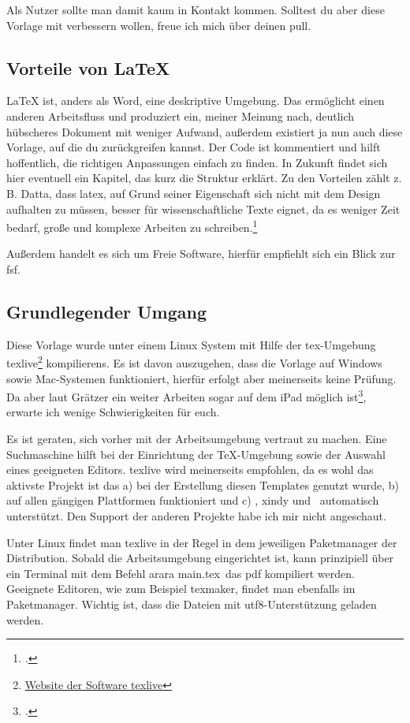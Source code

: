 Als Nutzer sollte man damit kaum in Kontakt kommen. Solltest du aber diese Vorlage mit verbessern wollen, freue ich mich über deinen \gls{pull}.
\subsection{Vorteile von \protect\LaTeX{}}%
\label{sec:vort-von}
\LaTeX{} ist, anders als Word, eine deskriptive Umgebung. Das ermöglicht einen anderen Arbeitsfluss und produziert ein, meiner Meinung nach, deutlich hübscheres Dokument mit weniger Aufwand, außerdem existiert ja nun auch diese Vorlage, auf die du zurückgreifen kannst. Der Code ist kommentiert und hilft hoffentlich, die richtigen Anpassungen einfach zu finden. In Zukunft findet sich hier eventuell ein Kapitel, das kurz die Struktur erklärt.
Zu den Vorteilen zählt z. B. Datta, dass \gls{latex}, auf Grund seiner Eigenschaft sich nicht mit dem Design aufhalten zu müssen, besser für wissenschaftliche Texte eignet, da es weniger Zeit bedarf, große und komplexe Arbeiten zu schreiben.\footcite[Vgl. ][S. 1f.]{datta_latex_2017}

Außerdem handelt es sich um Freie Software, hierfür empfiehlt sich ein Blick zur \gls{fsf}.
\subsection{Grundlegender Umgang}%
\label{sec:grundl}
Diese Vorlage wurde unter einem Linux System mit Hilfe der \gls{tex}-Umgebung texlive\footnote{\href{https://tug.org/texlive/}{Website der Software texlive}} \glspl{kompilieren}. Es ist davon auszugehen, dass die Vorlage auf Windows sowie Mac-Systemen funktioniert, hierfür erfolgt aber meinerseits keine Prüfung. Da aber laut Grätzer ein weiter Arbeiten sogar auf dem iPad möglich ist\footcite[Vgl. ][S. 179ff]{gratzer_practical_2014}, erwarte ich wenige Schwierigkeiten für euch.

Es ist geraten, sich vorher mit der Arbeitsumgebung vertraut zu machen. Eine Suchmaschine hilft bei der Einrichtung der TeX-Umgebung sowie der Auswahl eines geeigneten Editors. texlive wird meinerseits empfohlen, da es wohl das aktivste Projekt ist das a) bei der Erstellung diesen Templates genutzt wurde, b) auf allen gängigen Plattformen funktioniert und c) \protect{}, xindy und \protect{}\ automatisch unterstützt. Den Support der anderen Projekte habe ich mir nicht angeschaut.

Unter Linux findet man texlive in der Regel in dem jeweiligen Paketmanager der Distribution. Sobald die Arbeitsumgebung eingerichtet ist, kann prinzipiell über ein Terminal mit dem Befehl \glqq arara main.tex\grqq\ das pdf kompiliert werden.
Geeignete Editoren, wie zum Beispiel texmaker, findet man ebenfalls im Paketmanager. Wichtig ist, dass die Dateien mit \gls{utf8}-Unterstützung geladen werden.

